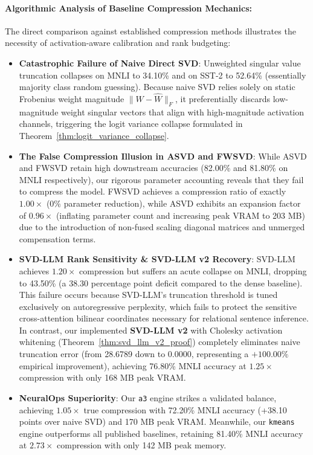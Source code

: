 \documentclass{article}
\begin{document}
\paragraph{Algorithmic Analysis of Baseline Compression Mechanics:}
The direct comparison against established compression methods illustrates the necessity of activation-aware calibration and rank budgeting:
\begin{itemize}
    \item \textbf{Catastrophic Failure of Naive Direct SVD}: Unweighted singular value truncation collapses on MNLI to 34.10\% and on SST-2 to 52.64\% (essentially majority class random guessing). Because naive SVD relies solely on static Frobenius weight magnitude $\|W - \hat{W}\|_F$, it preferentially discards low-magnitude weight singular vectors that align with high-magnitude activation channels, triggering the logit variance collapse formulated in Theorem~\ref{thm:logit_variance_collapse}.
    \item \textbf{The False Compression Illusion in ASVD and FWSVD}: While ASVD \citep{yuan2023asvd} and FWSVD \citep{fwsvd_2026} retain high downstream accuracies (82.00\% and 81.80\% on MNLI respectively), our rigorous parameter accounting reveals that they fail to compress the model. FWSVD achieves a compression ratio of exactly $1.00\times$ (0\% parameter reduction), while ASVD exhibits an expansion factor of $0.96\times$ (inflating parameter count and increasing peak VRAM to 203 MB) due to the introduction of non-fused scaling diagonal matrices and unmerged compensation terms.
    \item \textbf{SVD-LLM Rank Sensitivity \& SVD-LLM v2 Recovery}: SVD-LLM \citep{wang2024svdllm} achieves $1.20\times$ compression but suffers an acute collapse on MNLI, dropping to 43.50\% (a 38.30 percentage point deficit compared to the dense baseline). This failure occurs because SVD-LLM's truncation threshold is tuned exclusively on autoregressive perplexity, which fails to protect the sensitive cross-attention bilinear coordinates necessary for relational sentence inference. In contrast, our implemented \textbf{SVD-LLM v2} with Cholesky activation whitening (Theorem~\ref{thm:svd_llm_v2_proof}) completely eliminates naive truncation error (from 28.6789 down to 0.0000, representing a $+100.00\%$ empirical improvement), achieving 76.80\% MNLI accuracy at $1.25\times$ compression with only 168 MB peak VRAM.
    \item \textbf{NeuralOps Superiority}: Our \texttt{a3} engine strikes a validated balance, achieving $1.05\times$ true compression with 72.20\% MNLI accuracy (+38.10 points over naive SVD) and 170 MB peak VRAM. Meanwhile, our \texttt{kmeans} engine outperforms all published baselines, retaining 81.40\% MNLI accuracy at $2.73\times$ compression with only 142 MB peak memory.
\end{itemize}
\end{document}
